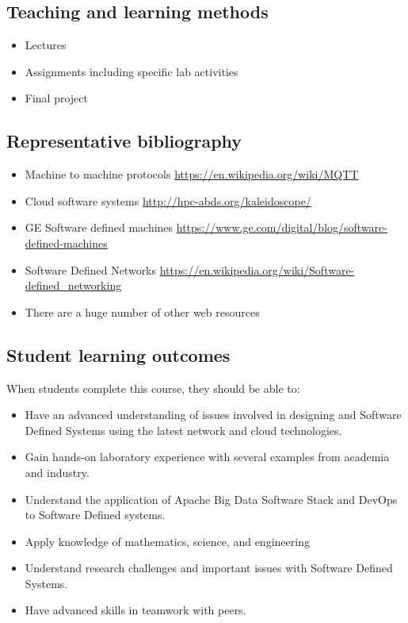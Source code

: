\subsection{Teaching and learning methods}

\begin{itemize}
\item Lectures
\item Assignments including specific lab activities
\item Final project 
\end{itemize}

\subsection{Representative bibliography}

\begin{itemize}
\item	Machine to machine protocols \url{https://en.wikipedia.org/wiki/MQTT}
\item	Cloud software systems \url{http://hpc-abds.org/kaleidoscope/}
\item	GE Software defined machines \url{https://www.ge.com/digital/blog/software-defined-machines}
\item	Software Defined Networks \url{https://en.wikipedia.org/wiki/Software-defined_networking}
\item	There are a huge number of other web resources
\end{itemize}

\subsection{Student learning outcomes}

When students complete this course, they should be able to:

\begin{itemize}
\item	Have an advanced understanding of issues involved in designing and Software Defined Systems using the latest network and cloud technologies.
\item	Gain hands-on laboratory experience with several examples from academia and industry.
\item	Understand the application of Apache Big Data Software Stack and DevOps to Software Defined systems.
\item	Apply knowledge of mathematics, science, and engineering
\item	Understand research challenges and important issues with Software Defined Systems.
\item	Have advanced skills in teamwork with peers.
\end{itemize}

